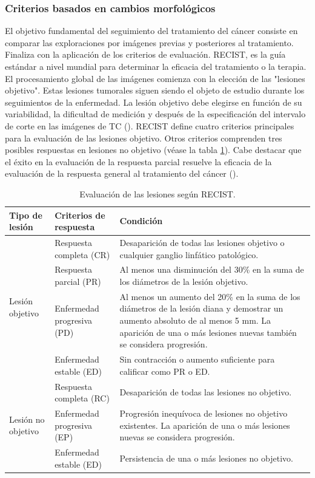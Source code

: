 \documentclass[11pt,a4paper,openany]{article}
\begin{document}
        \subsubsection{Criterios basados en cambios morfológicos}\label{seccion:CBMC}
         El objetivo fundamental del seguimiento del tratamiento del cáncer consiste en comparar las exploraciones por imágenes previas y posteriores al tratamiento. Finaliza con la aplicación de los criterios de evaluación. RECIST, es la guía estándar a nivel mundial para determinar la eficacia del tratamiento o la terapia. El procesamiento global de las imágenes comienza con la elección de las "lesiones objetivo". Estas lesiones tumorales siguen siendo el objeto de estudio durante los seguimientos de la enfermedad. La lesión objetivo debe elegirse en función de su variabilidad, la dificultad de medición y después de la especificación del intervalo de corte en las imágenes de TC (\cite{Deval2014}). RECIST define cuatro criterios principales para la evaluación de las lesiones objetivo. Otros criterios comprenden tres posibles respuestas en lesiones no objetivo (véase la tabla \ref{tab:RECISTRESPONSES}). Cabe destacar que el éxito en la evaluación de la respuesta parcial resuelve la eficacia de la evaluación de la respuesta general al tratamiento del cáncer (\cite{Eisenhauer2009}).

            \begin{table}[h]
                \caption{Evaluación de las lesiones según RECIST.\label{tab:RECISTRESPONSES}}
                \begin{tabular}{p{3cm} p{5cm} p{7cm}}
                    \hline
                    \textbf{Tipo de lesión} & \textbf{Criterios de respuesta} & \textbf{Condición} \\\hline
                    \multirow{4}{*}{Lesión objetivo} & Respuesta completa (CR) & Desaparición de todas las lesiones objetivo o cualquier ganglio linfático patológico. \\
                    & Respuesta parcial (PR) & Al menos una disminución del 30\% en la suma de los diámetros de la lesión objetivo. \\
                    & Enfermedad progresiva (PD) & Al menos un aumento del 20\% en la suma de los diámetros de la lesión diana y demostrar un aumento absoluto de al menos 5 mm. La aparición de una o más lesiones nuevas también se considera progresión. \\
                    & Enfermedad estable (ED) & Sin contracción o aumento suficiente para calificar como PR o ED. \\\hline
                    \multirow{3}{*}{Lesión no objetivo} & Respuesta completa (RC) & Desaparición de todas las lesiones no objetivo. \\
                    & Enfermedad progresiva (EP) & Progresión inequívoca de lesiones no objetivo existentes. La aparición de una o más lesiones nuevas se considera progresión.\\
                    & Enfermedad estable (ED) & Persistencia de una o más lesiones no objetivo.\\      
                    \hline
                \end{tabular}
            \end{table}
\end{document}
